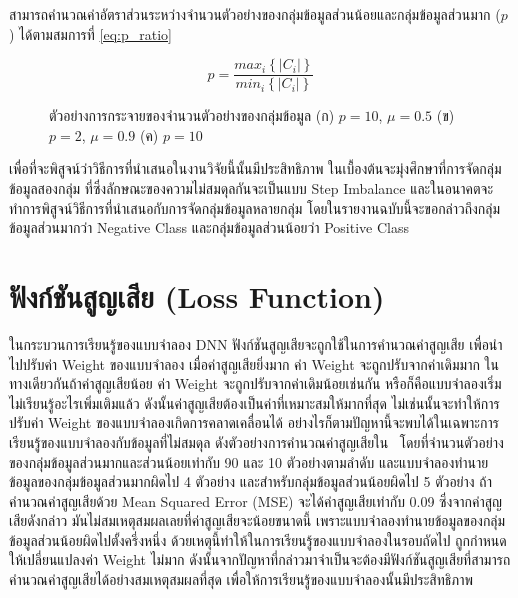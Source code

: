 สามารถคำนวณค่าอัตราส่วนระหว่างจำนวนตัวอย่างของกลุ่มข้อมูลส่วนน้อยและกลุ่มข้อมูลส่วนมาก ($p$) ได้ตามสมการที่ \ref{eq:p_ratio}

\begin{equation}
  p = \frac{max_{i}\left \{ \left | C_{i} \right | \right \}}{min_{i}\left \{ \left | C_{i} \right | \right \}}
  \label{eq:p_ratio}
\end{equation}

\begin{figure}[h]
  \centering
  \caption{ตัวอย่างการกระจายของจำนวนตัวอย่างของกลุ่มข้อมูล (ก) $p = 10$, $\mu = 0.5$ (ข) $p = 2$, $\mu = 0.9$ (ค) $p = 10$}
  \label{fig:imb-dist}
\end{figure}
\FloatBarrier

เพื่อที่จะพิสูจน์ว่าวิธีการที่นำเสนอในงานวิจัยนี้นั้นมีประสิทธิภาพ ในเบื้องต้นจะมุ่งศึกษาที่การจัดกลุ่มข้อมูลสองกลุ่ม ที่ซึ่งลักษณะของความไม่สมดุลกันจะเป็นแบบ Step Imbalance และในอนาคตจะทำการพิสูจน์วิธีการที่นำเสนอกับการจัดกลุ่มข้อมูลหลายกลุ่ม โดยในรายงานฉบับนี้จะขอกล่าวถึงกลุ่มข้อมูลส่วนมากว่า Negative Class และกลุ่มข้อมูลส่วนน้อยว่า Positive Class

\section{ฟังก์ชันสูญเสีย (Loss Function)}
ในกระบวนการเรียนรู้ของแบบจำลอง DNN ฟังก์ชันสูญเสียจะถูกใช้ในการคำนวณค่าสูญเสีย เพื่อนำไปปรับค่า Weight ของแบบจำลอง เมื่อค่าสูญเสียยิ่งมาก ค่า Weight จะถูกปรับจากค่าเดิมมาก ในทางเดียวกันถ้าค่าสูญเสียน้อย ค่า Weight จะถูกปรับจากค่าเดิมน้อยเช่นกัน หรือก็คือแบบจำลองเริ่มไม่เรียนรู้อะไรเพิ่มเติมแล้ว ดังนั้นค่าสูญเสียต้องเป็นค่าที่เหมาะสมให้มากที่สุด ไม่เช่นนั้นจะทำให้การปรับค่า Weight ของแบบจำลองเกิดการคลาดเคลื่อนได้ อย่างไรก็ตามปัญหานี้จะพบได้ในเฉพาะการเรียนรู้ของแบบจำลองกับข้อมูลที่ไม่สมดุล ดังตัวอย่างการคำนวณค่าสูญเสียใน~\cite{Wang:2016} โดยที่จำนวนตัวอย่างของกลุ่มข้อมูลส่วนมากและส่วนน้อยเท่ากับ 90 และ  10 ตัวอย่างตามลำดับ และแบบจำลองทำนายข้อมูลของกลุ่มข้อมูลส่วนมากผิดไป 4 ตัวอย่าง และสำหรับกลุ่มข้อมูลส่วนน้อยผิดไป 5 ตัวอย่าง ถ้าคำนวณค่าสูญเสียด้วย Mean Squared Error (MSE) จะได้ค่าสูญเสียเท่ากับ 0.09 ซึ่งจากค่าสูญเสียดังกล่าว มันไม่สมเหตุสมผลเลยที่ค่าสูญเสียจะน้อยขนาดนี้ เพราะแบบจำลองทำนายข้อมูลของกลุ่มข้อมูลส่วนน้อยผิดไปตั้งครึ่งหนึ่ง ด้วยเหตุนี้ทำให้ในการเรียนรู้ของแบบจำลองในรอบถัดไป ถูกกำหนดให้เปลี่ยนแปลงค่า Weight ไม่มาก ดังนั้นจากปัญหาที่กล่าวมาจำเป็นจะต้องมีฟังก์ชันสูญเสียที่สามารถคำนวณค่าสูญเสียได้อย่างสมเหตุสมผลที่สุด เพื่อให้การเรียนรู้ของแบบจำลองนั้นมีประสิทธิภาพ